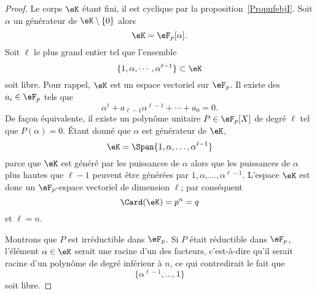 \begin{proof}
	Le corps \( \eK\) étant fini, il est cyclique par la proposition~\ref{PropnfebjI}. Soit \( \alpha\) un générateur de \( \eK\setminus\{ 0 \}\) alors
	\begin{equation}
		\eK=\eF_p[\alpha].
	\end{equation}
	Soit \( \ell\) le plus grand entier tel que l'ensemble
	\begin{equation}
		\{ 1,\alpha,\cdots,\alpha^{\ell-1} \}\subset\eK
	\end{equation}
	soit libre. Pour rappel, \( \eK\) est un espace vectoriel sur \( \eF_p\). Il existe des \( a_i\in \eF_p\) tels que
	\begin{equation}
		\alpha^{\ell}+a_{\ell-1}\alpha^{\ell-1}+\cdots+a_0=0.
	\end{equation}
	De façon équivalente, il existe un polynôme unitaire \( P\in\eF_p[X]\) de degré \( \ell\) tel que \( P(\alpha)=0\). Étant donné que \( \alpha\) est générateur de \( \eK\),
	\begin{equation}
		\eK=\Span\{ 1,\alpha,\ldots, \alpha^{\ell-1} \}
	\end{equation}
	parce que \( \eK\) est généré par les puissances de \( \alpha\) alors que les puissances de \( \alpha\) plus hautes que \( \ell-1\) peuvent être générées par \( 1,\alpha,\ldots, \alpha^{\ell-1}\). L'espace \( \eK\) est donc un \( \eF_p\)-espace vectoriel de dimension \( \ell\); par conséquent
	\begin{equation}
		\Card(\eK)=p^n=q
	\end{equation}
	et \( \ell=n\).

	Montrons que \( P\) est irréductible dans \( \eF_p\). Si \( P\) était réductible dans \( \eF_p\), l'élément \( \alpha\in \eK\) serait une racine d'un des facteurs, c'est-à-dire qu'il serait racine d'un polynôme de degré inférieur à \( n\), ce qui contredirait le fait que
	\begin{equation}
		\{ \alpha^{\ell-1},\ldots, 1 \}
	\end{equation}
	soit libre.


\end{proof}
